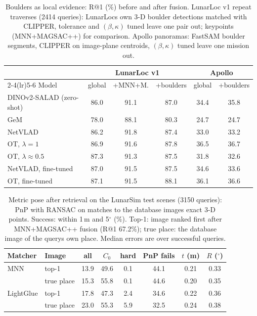 \begin{table}[t]
\centering
\footnotesize
\setlength{\tabcolsep}{3pt}
\caption{Boulders as local evidence: R@1 (\%) before and after fusion. LunarLoc v1 repeat traverses (2414 queries): LunarLoc\textquotesingle s own 3-D boulder detections matched with CLIPPER, tolerance and $(\beta,\kappa)$ tuned leave one pair out; keypoints (MNN+MAGSAC++) for comparison. Apollo panoramas: FastSAM boulder segments, CLIPPER on image-plane centroids, $(\beta,\kappa)$ tuned leave one mission out.}
\label{tab:boulders}
\begin{tabular}{@{}lccccc@{}}
\toprule
 & \multicolumn{3}{c}{LunarLoc v1} & \multicolumn{2}{c}{Apollo} \\
\cmidrule(lr){2-4}\cmidrule(lr){5-6}
Model & global & +MNN+M. & +boulders & global & +boulders \\
\midrule
DINOv2-SALAD (zero-shot) & 86.0 & 91.1 & 87.0 & 34.4 & 35.8 \\
GeM & 78.0 & 88.1 & 80.3 & 24.7 & 24.7 \\
NetVLAD & 86.2 & 91.8 & 87.4 & 33.0 & 33.2 \\
OT, $\lambda=1$ & 86.9 & 91.6 & 87.8 & 36.5 & 36.7 \\
OT, $\lambda\approx0.5$ & 87.3 & 91.3 & 87.5 & 31.8 & 32.6 \\
NetVLAD, fine-tuned & 87.0 & 91.5 & 87.5 & 34.6 & 33.6 \\
OT, fine-tuned & 87.1 & 91.5 & 88.1 & 36.1 & 36.6 \\
\bottomrule
\end{tabular}
\end{table}

\begin{table}[t]
\centering
\footnotesize
\setlength{\tabcolsep}{3pt}
\caption{Metric pose after retrieval on the LunarSim test scenes (3150 queries): PnP with RANSAC on matches to the database image\textquotesingle s exact 3-D points. Success: within 1\,m and 5$^\circ$ (\%). Top-1: image ranked first after MNN+MAGSAC++ fusion (R@1 67.2\%); true place: the database image of the query\textquotesingle s own place. Median errors are over successful queries.}
\label{tab:pose}
\begin{tabular}{@{}llcccccc@{}}
\toprule
Matcher & Image & all & $C_0$ & hard & PnP fails & $t$ (m) & $R$ ($^\circ$) \\
\midrule
MNN & top-1 & 13.9 & 49.6 & 0.1 & 44.1 & 0.21 & 0.33 \\
 & true place & 15.3 & 55.8 & 0.1 & 44.6 & 0.20 & 0.35 \\
LightGlue & top-1 & 17.8 & 47.3 & 2.4 & 34.6 & 0.22 & 0.36 \\
 & true place & 23.0 & 55.3 & 5.9 & 32.5 & 0.24 & 0.38 \\
\bottomrule
\end{tabular}
\end{table}
